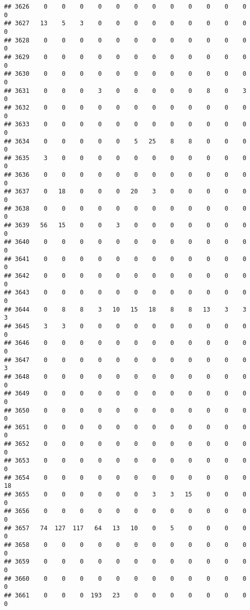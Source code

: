 \documentclass[]{article}
\begin{document}
\begin{verbatim}
## 3626    0    0    0    0    0    0    0    0    0    0    0    0    0
## 3627   13    5    3    0    0    0    0    0    0    0    0    0    0
## 3628    0    0    0    0    0    0    0    0    0    0    0    0    0
## 3629    0    0    0    0    0    0    0    0    0    0    0    0    0
## 3630    0    0    0    0    0    0    0    0    0    0    0    0    0
## 3631    0    0    0    3    0    0    0    0    0    8    0    3    0
## 3632    0    0    0    0    0    0    0    0    0    0    0    0    0
## 3633    0    0    0    0    0    0    0    0    0    0    0    0    0
## 3634    0    0    0    0    0    5   25    8    8    0    0    0    0
## 3635    3    0    0    0    0    0    0    0    0    0    0    0    0
## 3636    0    0    0    0    0    0    0    0    0    0    0    0    0
## 3637    0   18    0    0    0   20    3    0    0    0    0    0    0
## 3638    0    0    0    0    0    0    0    0    0    0    0    0    0
## 3639   56   15    0    0    3    0    0    0    0    0    0    0    0
## 3640    0    0    0    0    0    0    0    0    0    0    0    0    0
## 3641    0    0    0    0    0    0    0    0    0    0    0    0    0
## 3642    0    0    0    0    0    0    0    0    0    0    0    0    0
## 3643    0    0    0    0    0    0    0    0    0    0    0    0    0
## 3644    0    8    8    3   10   15   18    8    8   13    3    3    3
## 3645    3    3    0    0    0    0    0    0    0    0    0    0    0
## 3646    0    0    0    0    0    0    0    0    0    0    0    0    0
## 3647    0    0    0    0    0    0    0    0    0    0    0    0    3
## 3648    0    0    0    0    0    0    0    0    0    0    0    0    0
## 3649    0    0    0    0    0    0    0    0    0    0    0    0    0
## 3650    0    0    0    0    0    0    0    0    0    0    0    0    0
## 3651    0    0    0    0    0    0    0    0    0    0    0    0    0
## 3652    0    0    0    0    0    0    0    0    0    0    0    0    0
## 3653    0    0    0    0    0    0    0    0    0    0    0    0    0
## 3654    0    0    0    0    0    0    0    0    0    0    0    0   18
## 3655    0    0    0    0    0    0    3    3   15    0    0    0    0
## 3656    0    0    0    0    0    0    0    0    0    0    0    0    0
## 3657   74  127  117   64   13   10    0    5    0    0    0    0    0
## 3658    0    0    0    0    0    0    0    0    0    0    0    0    0
## 3659    0    0    0    0    0    0    0    0    0    0    0    0    0
## 3660    0    0    0    0    0    0    0    0    0    0    0    0    0
## 3661    0    0    0  193   23    0    0    0    0    0    0    0    0

\end{verbatim}
\end{document}

